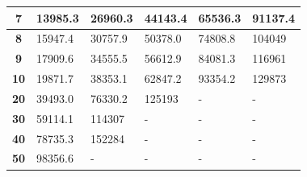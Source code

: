 \begin{table}[H]
\begin{tabular}{|c|l|l|l|l|l|}
\textbf{7}                                                                          & 13985.3                              & 26960.3                               & 44143.4                               & 65536.3                               & 91137.4                               \\ \hline
\textbf{8}                                                                          & 15947.4                              & 30757.9                               & 50378.0                               & 74808.8                               & 104049                                \\ \hline
\textbf{9}                                                                          & 17909.6                              & 34555.5                               & 56612.9                               & 84081.3                               & 116961                                \\ \hline
\textbf{10}                                                                         & 19871.7                              & 38353.1                               & 62847.2                               & 93354.2                               & 129873                                \\ \hline
\textbf{20}                                                                         & 39493.0                              & 76330.2                               & 125193                                & -                                     & -                                     \\ \hline
\textbf{30}                                                                         & 59114.1                              & 114307                                & -                                     & -                                     & -                                     \\ \hline
\textbf{40}                                                                         & 78735.3                              & 152284                                & -                                     & -                                     & -                                     \\ \hline
\textbf{50}                                                                         & 98356.6                              & -                                     & -                                     & -                                     & -                                     \\ \hline

\end{tabular}
\end{table}
